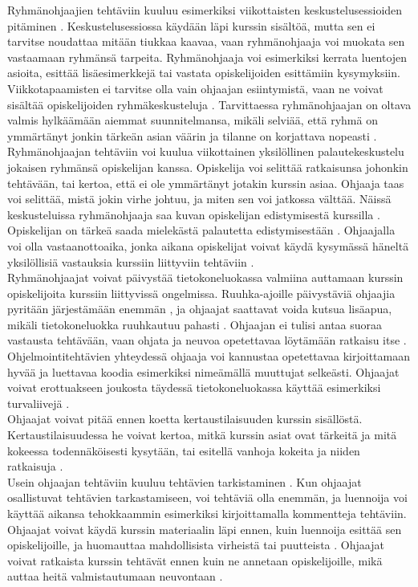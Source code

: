 \documentclass[finnish]{tktltiki2}
\theoremstyle{definition}
\theoremstyle{remark}
\begin{document}
Ryhmänohjaajien tehtäviin kuuluu esimerkiksi viikottaisten keskustelusessioiden pitäminen \cite{Reges88}. Keskustelusessiossa käydään läpi kurssin sisältöä, mutta sen ei tarvitse noudattaa mitään tiukkaa kaavaa, vaan ryhmänohjaaja voi muokata sen vastaamaan ryhmänsä tarpeita. Ryhmänohjaaja voi esimerkiksi kerrata luentojen asioita, esittää lisäesimerkkejä tai vastata opiskelijoiden esittämiin kysymyksiin. Viikkotapaamisten ei tarvitse olla vain ohjaajan esiintymistä, vaan ne voivat sisältää opiskelijoiden ryhmäkeskusteluja \cite{Decker06}. Tarvittaessa ryhmänohjaajan on oltava valmis hylkäämään aiemmat suunnitelmansa, mikäli selviää, että ryhmä on ymmärtänyt jonkin tärkeän asian väärin ja tilanne on korjattava nopeasti \cite{Reges88}.
\\
Ryhmänohjaajan tehtäviin voi kuulua viikottainen yksilöllinen palautekeskustelu jokaisen ryhmänsä opiskelijan kanssa. Opiskelija voi selittää ratkaisunsa johonkin tehtävään, tai kertoa, että ei ole ymmärtänyt jotakin kurssin asiaa. Ohjaaja taas voi selittää, mistä jokin virhe johtuu, ja miten sen voi jatkossa välttää. Näissä keskusteluissa ryhmänohjaaja saa kuvan opiskelijan edistymisestä kurssilla \cite{Reges88,Reges03}. Opiskelijan on tärkeä saada mielekästä palautetta edistymisestään \cite{Kurhila11}. Ohjaajalla voi olla vastaanottoaika, jonka aikana opiskelijat voivat käydä kysymässä häneltä yksilöllisiä vastauksia kurssiin liittyviin tehtäviin \cite{Decker06}.
\\
Ryhmänohjaajat voivat päivystää tietokoneluokassa valmiina auttamaan kurssin opiskelijoita kurssiin liittyvissä ongelmissa. Ruuhka-ajoille päivystäviä ohjaajia pyritään järjestämään enemmän \cite{Reges88, Reges03}, ja ohjaajat saattavat voida kutsua lisäapua, mikäli tietokoneluokka ruuhkautuu pahasti \cite{Kurhila11}. Ohjaajan ei tulisi antaa suoraa vastausta tehtävään, vaan ohjata ja neuvoa opetettavaa löytämään ratkaisu itse \cite{Vikberg, Kurhila11}. Ohjelmointitehtävien yhteydessä ohjaaja voi kannustaa opetettavaa kirjoittamaan hyvää ja luettavaa koodia esimerkiksi nimeämällä muuttujat selkeästi. Ohjaajat voivat erottuakseen joukosta täydessä tietokoneluokassa käyttää esimerkiksi turvaliivejä \cite{Vihavainen}. 
\\
Ohjaajat voivat pitää ennen koetta kertaustilaisuuden kurssin sisällöstä. Kertaustilaisuudessa he voivat kertoa, mitkä kurssin asiat ovat tärkeitä ja mitä kokeessa todennäköisesti kysytään, tai esitellä vanhoja kokeita ja niiden ratkaisuja \cite{Decker06}.
\\
Usein ohjaajan tehtäviin kuuluu tehtävien tarkistaminen \cite{Dickson11}. Kun ohjaajat osallistuvat tehtävien tarkastamiseen, voi tehtäviä olla enemmän, ja luennoija voi käyttää aikansa tehokkaammin esimerkiksi kirjoittamalla kommentteja tehtäviin. Ohjaajat voivat käydä kurssin materiaalin läpi ennen, kuin luennoija esittää sen opiskelijoille, ja huomauttaa mahdollisista virheistä tai puutteista \cite{Vikberg}. Ohjaajat voivat ratkaista kurssin tehtävät ennen kuin ne annetaan opiskelijoille, mikä auttaa heitä valmistautumaan neuvontaan \cite{Vihavainen}.
\end{document}
